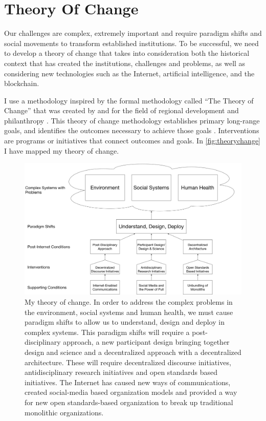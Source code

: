 
\chapter{Theory Of Change} %
\label{chap:theory}

Our challenges are complex, extremely important and require paradigm shifts and social movements to transform established institutions. To be successful, we need to develop a theory of change that takes into consideration both the historical context that has created the institutions, challenges and problems, as well as considering new technologies such as the Internet, artificial intelligence, and the blockchain.

I use a methodology inspired by the formal methodology called ``The Theory of Change'' that was created by and for the field of regional development and philanthropy \cite{brest2010power}. This theory of change methodology establishes primary long-range goals, and identifies the outcomes necessary to achieve those goals \cite{theoryofchangeprim}. Interventions are programs or initiatives that connect outcomes and goals. In \autoref{fig:theorychange} I have mapped my theory of change.

\begin{figure}[h]
 \centering
 \includegraphics[width=1\textwidth]{pictures/TheoryOfChange}
 \caption[Diagram of my theory of change.]{My theory of change. In order to address the complex problems in the environment, social systems and human health, we must cause paradigm shifts to allow us to understand, design and deploy in complex systems. This paradigm shifts will require a post-disciplinary approach, a new participant design bringing together design and science and a decentralized approach with a decentralized architecture. These will require decentralized discourse initiatives, antidisciplinary research initiatives and open standards based initiatives. The Internet has caused new ways of communications, created social-media based organization models and provided a way for new open standards-based organization to break up traditional monolithic organizations.}
 \label{fig:theorychange}
\end{figure}

